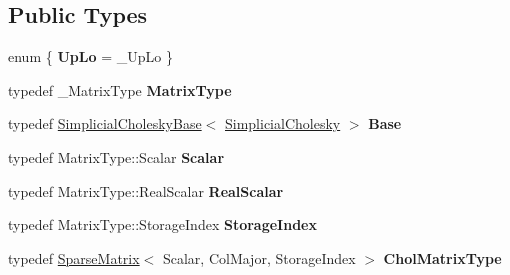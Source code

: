 \subsection*{Public Types}
\begin{DoxyCompactItemize}
\item 
\mbox{\label{class_eigen_1_1_simplicial_cholesky_a602dd5c3ffb9c0f07f8785077dc514a8}} 
enum \{ {\bfseries Up\+Lo} = \+\_\+\+Up\+Lo
 \}
\item 
\mbox{\label{class_eigen_1_1_simplicial_cholesky_aa1b165c53eeb528234a8de0f233760a3}} 
typedef \+\_\+\+Matrix\+Type {\bfseries Matrix\+Type}
\item 
\mbox{\label{class_eigen_1_1_simplicial_cholesky_a6757d9f8f6d495673db87523c488ce5a}} 
typedef \mbox{\hyperlink{class_eigen_1_1_simplicial_cholesky_base}{Simplicial\+Cholesky\+Base}}$<$ \mbox{\hyperlink{class_eigen_1_1_simplicial_cholesky}{Simplicial\+Cholesky}} $>$ {\bfseries Base}
\item 
\mbox{\label{class_eigen_1_1_simplicial_cholesky_a7c9d5750181ae983f05621d8fa9bf10f}} 
typedef Matrix\+Type\+::\+Scalar {\bfseries Scalar}
\item 
\mbox{\label{class_eigen_1_1_simplicial_cholesky_a398cad206f425e156e7d4a07c33e1290}} 
typedef Matrix\+Type\+::\+Real\+Scalar {\bfseries Real\+Scalar}
\item 
\mbox{\label{class_eigen_1_1_simplicial_cholesky_afdf439e67a29ef03ca6128f36b43a24d}} 
typedef Matrix\+Type\+::\+Storage\+Index {\bfseries Storage\+Index}
\item 
\mbox{\label{class_eigen_1_1_simplicial_cholesky_a02a3b97b214580475504aff2c2cceb32}} 
typedef \mbox{\hyperlink{class_eigen_1_1_sparse_matrix}{Sparse\+Matrix}}$<$ Scalar, Col\+Major, Storage\+Index $>$ {\bfseries Chol\+Matrix\+Type}
\item 
\mbox{\label{class_eigen_1_1_simplicial_cholesky_ad3f93dabee096aa8393fcb796c90cd78}} 

\end{DoxyCompactItemize}
